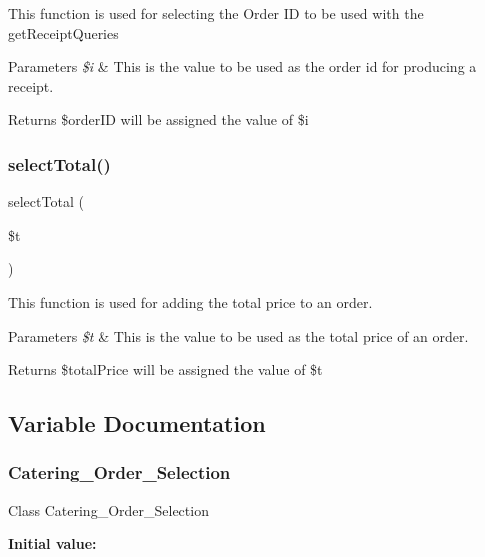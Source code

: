 This function is used for selecting the Order ID to be used with the get\+Receipt\+Queries 
\begin{DoxyParams}{Parameters}
{\em \$i} & This is the value to be used as the order id for producing a receipt. \\
\hline
\end{DoxyParams}
\begin{DoxyReturn}{Returns}
\$order\+ID will be assigned the value of \$i 
\end{DoxyReturn}
\mbox{\label{_catering___order___selection_8class_8php_a8479e007f854c94229714a8425c5b6c0}} 
\subsubsection{\texorpdfstring{selectTotal()}{selectTotal()}}
{\footnotesize\ttfamily select\+Total (\begin{DoxyParamCaption}\item[{}]{\$t }\end{DoxyParamCaption})}

This function is used for adding the total price to an order. 
\begin{DoxyParams}{Parameters}
{\em \$t} & This is the value to be used as the total price of an order. \\
\hline
\end{DoxyParams}
\begin{DoxyReturn}{Returns}
\$total\+Price will be assigned the value of \$t 
\end{DoxyReturn}


\subsection{Variable Documentation}
\mbox{\label{_catering___order___selection_8class_8php_aebb6021aa7a5316a9d74c95e0314bd1e}} 
\subsubsection{\texorpdfstring{Catering\_Order\_Selection}{Catering\_Order\_Selection}}
{\footnotesize\ttfamily Class Catering\+\_\+\+Order\+\_\+\+Selection}

{\bfseries Initial value\+:}
\begin{DoxyCode}{0}
\DoxyCodeLine{\{}

\end{DoxyCode}
